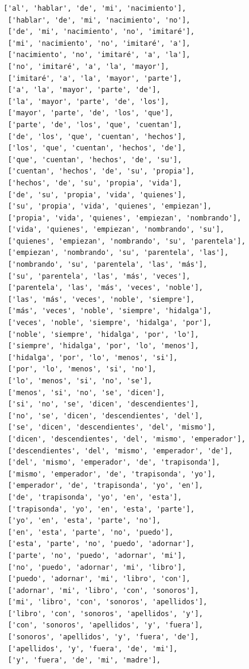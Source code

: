 \documentclass[11pt]{article}
\begin{document}
\begin{tcolorbox}[breakable, size=fbox, boxrule=1pt, pad at break*=1mm,colback=cellbackground, colframe=cellborder]
\begin{Verbatim}[commandchars=\\\{\}]
 ['al', 'hablar', 'de', 'mi', 'nacimiento'],
 ['hablar', 'de', 'mi', 'nacimiento', 'no'],
 ['de', 'mi', 'nacimiento', 'no', 'imitaré'],
 ['mi', 'nacimiento', 'no', 'imitaré', 'a'],
 ['nacimiento', 'no', 'imitaré', 'a', 'la'],
 ['no', 'imitaré', 'a', 'la', 'mayor'],
 ['imitaré', 'a', 'la', 'mayor', 'parte'],
 ['a', 'la', 'mayor', 'parte', 'de'],
 ['la', 'mayor', 'parte', 'de', 'los'],
 ['mayor', 'parte', 'de', 'los', 'que'],
 ['parte', 'de', 'los', 'que', 'cuentan'],
 ['de', 'los', 'que', 'cuentan', 'hechos'],
 ['los', 'que', 'cuentan', 'hechos', 'de'],
 ['que', 'cuentan', 'hechos', 'de', 'su'],
 ['cuentan', 'hechos', 'de', 'su', 'propia'],
 ['hechos', 'de', 'su', 'propia', 'vida'],
 ['de', 'su', 'propia', 'vida', 'quienes'],
 ['su', 'propia', 'vida', 'quienes', 'empiezan'],
 ['propia', 'vida', 'quienes', 'empiezan', 'nombrando'],
 ['vida', 'quienes', 'empiezan', 'nombrando', 'su'],
 ['quienes', 'empiezan', 'nombrando', 'su', 'parentela'],
 ['empiezan', 'nombrando', 'su', 'parentela', 'las'],
 ['nombrando', 'su', 'parentela', 'las', 'más'],
 ['su', 'parentela', 'las', 'más', 'veces'],
 ['parentela', 'las', 'más', 'veces', 'noble'],
 ['las', 'más', 'veces', 'noble', 'siempre'],
 ['más', 'veces', 'noble', 'siempre', 'hidalga'],
 ['veces', 'noble', 'siempre', 'hidalga', 'por'],
 ['noble', 'siempre', 'hidalga', 'por', 'lo'],
 ['siempre', 'hidalga', 'por', 'lo', 'menos'],
 ['hidalga', 'por', 'lo', 'menos', 'si'],
 ['por', 'lo', 'menos', 'si', 'no'],
 ['lo', 'menos', 'si', 'no', 'se'],
 ['menos', 'si', 'no', 'se', 'dicen'],
 ['si', 'no', 'se', 'dicen', 'descendientes'],
 ['no', 'se', 'dicen', 'descendientes', 'del'],
 ['se', 'dicen', 'descendientes', 'del', 'mismo'],
 ['dicen', 'descendientes', 'del', 'mismo', 'emperador'],
 ['descendientes', 'del', 'mismo', 'emperador', 'de'],
 ['del', 'mismo', 'emperador', 'de', 'trapisonda'],
 ['mismo', 'emperador', 'de', 'trapisonda', 'yo'],
 ['emperador', 'de', 'trapisonda', 'yo', 'en'],
 ['de', 'trapisonda', 'yo', 'en', 'esta'],
 ['trapisonda', 'yo', 'en', 'esta', 'parte'],
 ['yo', 'en', 'esta', 'parte', 'no'],
 ['en', 'esta', 'parte', 'no', 'puedo'],
 ['esta', 'parte', 'no', 'puedo', 'adornar'],
 ['parte', 'no', 'puedo', 'adornar', 'mi'],
 ['no', 'puedo', 'adornar', 'mi', 'libro'],
 ['puedo', 'adornar', 'mi', 'libro', 'con'],
 ['adornar', 'mi', 'libro', 'con', 'sonoros'],
 ['mi', 'libro', 'con', 'sonoros', 'apellidos'],
 ['libro', 'con', 'sonoros', 'apellidos', 'y'],
 ['con', 'sonoros', 'apellidos', 'y', 'fuera'],
 ['sonoros', 'apellidos', 'y', 'fuera', 'de'],
 ['apellidos', 'y', 'fuera', 'de', 'mi'],
 ['y', 'fuera', 'de', 'mi', 'madre'],

\end{Verbatim}
\end{tcolorbox}
\end{document}
